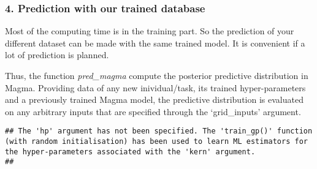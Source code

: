 \documentclass[
]{article}
\newenvironment{Shaded}{\begin{snugshade}}{\end{snugshade}}
\newcommand{\AttributeTok}[1]{\textcolor[rgb]{0.77,0.63,0.00}{#1}}
\newcommand{\ConstantTok}[1]{\textcolor[rgb]{0.00,0.00,0.00}{#1}}
\newcommand{\DecValTok}[1]{\textcolor[rgb]{0.00,0.00,0.81}{#1}}
\newcommand{\FloatTok}[1]{\textcolor[rgb]{0.00,0.00,0.81}{#1}}
\newcommand{\FunctionTok}[1]{\textcolor[rgb]{0.00,0.00,0.00}{#1}}
\newcommand{\NormalTok}[1]{#1}
\newcommand{\OtherTok}[1]{\textcolor[rgb]{0.56,0.35,0.01}{#1}}
\newcommand{\SpecialCharTok}[1]{\textcolor[rgb]{0.00,0.00,0.00}{#1}}
\newcommand{\StringTok}[1]{\textcolor[rgb]{0.31,0.60,0.02}{#1}}
\begin{document}
\hypertarget{prediction-with-our-trained-database}{%
\subsubsection{4. Prediction with our trained
database}\label{prediction-with-our-trained-database}}

Most of the computing time is in the training part. So the prediction of
your different dataset can be made with the same trained model. It is
convenient if a lot of prediction is planned.

Thus, the function \emph{pred\_magma} compute the posterior predictive
distribution in Magma. Providing data of any new inividual/task, its
trained hyper-parameters and a previously trained Magma model, the
predictive distribution is evaluated on any arbitrary inputs that are
specified through the `grid\_inputs' argument.

\begin{Shaded}
\end{Shaded}

\begin{verbatim}
## The 'hp' argument has not been specified. The 'train_gp()' function (with random initialisation) has been used to learn ML estimators for the hyper-parameters associated with the 'kern' argument.
## 
\end{verbatim}
\end{document}
